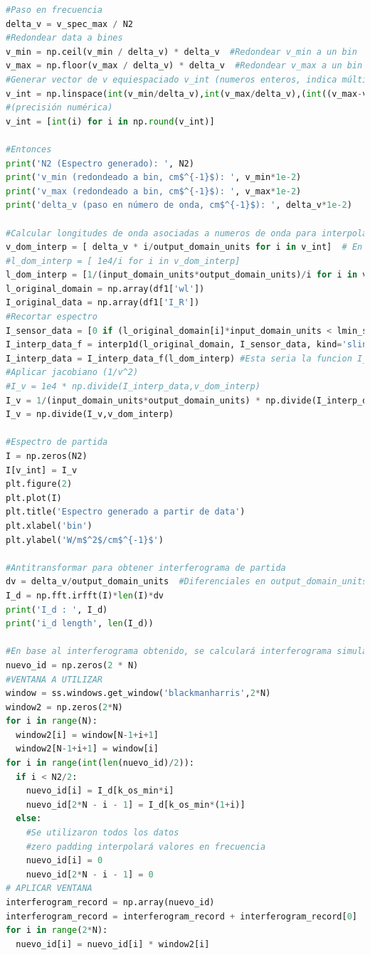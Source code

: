 \documentclass[11pt,titlepage]{article}
\begin{document}
\begin{lstlisting}[language=Python, caption=Python example]
#Paso en frecuencia
delta_v = v_spec_max / N2 
#Redondear data a bines
v_min = np.ceil(v_min / delta_v) * delta_v  #Redondear v_min a un bin
v_max = np.floor(v_max / delta_v) * delta_v  #Redondear v_max a un bin
#Generar vector de v equiespaciado v_int (numeros enteros, indica múltiplos de delta_v)
v_int = np.linspace(int(v_min/delta_v),int(v_max/delta_v),(int((v_max-v_min)/delta_v)+1))
#(precisión numérica)
v_int = [int(i) for i in np.round(v_int)]

#Entonces
print('N2 (Espectro generado): ', N2)
print('v_min (redondeado a bin, cm$^{-1}$): ', v_min*1e-2)
print('v_max (redondeado a bin, cm$^{-1}$): ', v_max*1e-2)
print('delta_v (paso en número de onda, cm$^{-1}$): ', delta_v*1e-2)

#Calcular longitudes de onda asociadas a numeros de onda para interpolar, en unidades de entrada
v_dom_interp = [ delta_v * i/output_domain_units for i in v_int]  # En unidades de salida
#l_dom_interp = [ 1e4/i for i in v_dom_interp]
l_dom_interp = [1/(input_domain_units*output_domain_units)/i for i in v_dom_interp] #En unidades de entrada
l_original_domain = np.array(df1['wl'])
I_original_data = np.array(df1['I_R'])
#Recortar espectro
I_sensor_data = [0 if (l_original_domain[i]*input_domain_units < lmin_sensor or l_original_domain[i]*input_domain_units > lmax_sensor) else I_original_data[i] for i in range(len(I_original_data))]
I_interp_data_f = interp1d(l_original_domain, I_sensor_data, kind='slinear',fill_value=[0])
I_interp_data = I_interp_data_f(l_dom_interp) #Esta seria la funcion I_data_lambda(1/v)
#Aplicar jacobiano (1/v^2)
#I_v = 1e4 * np.divide(I_interp_data,v_dom_interp)
I_v = 1/(input_domain_units*output_domain_units) * np.divide(I_interp_data,v_dom_interp)
I_v = np.divide(I_v,v_dom_interp)

#Espectro de partida
I = np.zeros(N2)
I[v_int] = I_v
plt.figure(2)
plt.plot(I)
plt.title('Espectro generado a partir de data')
plt.xlabel('bin')
plt.ylabel('W/m$^2$/cm$^{-1}$')

#Antitransformar para obtener interferograma de partida
dv = delta_v/output_domain_units  #Diferenciales en output_domain_units, al integrar W/m^2/cm^-1*cm^-1 = W/m^2
I_d = np.fft.irfft(I)*len(I)*dv
print('I_d : ', I_d)
print('i_d length', len(I_d))

#En base al interferograma obtenido, se calculará interferograma simulado
nuevo_id = np.zeros(2 * N)
#VENTANA A UTILIZAR
window = ss.windows.get_window('blackmanharris',2*N)
window2 = np.zeros(2*N)
for i in range(N):
  window2[i] = window[N-1+i+1]
  window2[N-1+i+1] = window[i]
for i in range(int(len(nuevo_id)/2)):
  if i < N2/2:
    nuevo_id[i] = I_d[k_os_min*i]
    nuevo_id[2*N - i - 1] = I_d[k_os_min*(1+i)]
  else:
    #Se utilizaron todos los datos
    #zero padding interpolará valores en frecuencia
    nuevo_id[i] = 0
    nuevo_id[2*N - i - 1] = 0
# APLICAR VENTANA
interferogram_record = np.array(nuevo_id)
interferogram_record = interferogram_record + interferogram_record[0]
for i in range(2*N):
  nuevo_id[i] = nuevo_id[i] * window2[i]


\end{lstlisting}
\end{document}
